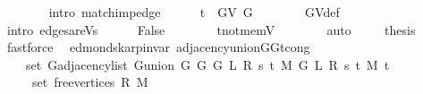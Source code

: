 \begin{isabellebody}
\ \ \ \ \ \ \isamarkupfalse%
\ {\isacharparenleft}{\kern0pt}intro\ match{\isacharunderscore}{\kern0pt}imp{\isacharunderscore}{\kern0pt}edge{\isacharparenright}{\kern0pt}\isanewline
\ \ \ \ \isamarkupfalse%
\ {\isachardoublequoteopen}t\ {\isasymin}\ G{\isachardot}{\kern0pt}V\ G{\isachardoublequoteclose}\isanewline
\ \ \ \ \ \ \isamarkupfalse%
\ G{\isachardot}{\kern0pt}V{\isacharunderscore}{\kern0pt}def\isanewline
\ \ \ \ \ \ \isamarkupfalse%
\ {\isacharparenleft}{\kern0pt}intro\ edges{\isacharunderscore}{\kern0pt}are{\isacharunderscore}{\kern0pt}Vs{\isacharparenright}{\kern0pt}\isanewline
\ \ \ \ \isamarkupfalse%
\ False\isanewline
\ \ \ \ \ \ \isamarkupfalse%
\ t{\isacharunderscore}{\kern0pt}not{\isacharunderscore}{\kern0pt}mem{\isacharunderscore}{\kern0pt}V\isanewline
\ \ \ \ \ \ \isamarkupfalse%
\ auto\ \isacommand{{\isacharbraceright}{\kern0pt}}\isamarkupfalse%
\isanewline
\ \ \isamarkupfalse%
\ {\isacharquery}{\kern0pt}thesis\isanewline
\ \ \ \ \isamarkupfalse%
\ fastforce\isanewline
{}\isamarkupfalse%
%
\endisatagproof
{\isafoldproof}%
%
\isadelimproof
\isanewline
%
\endisadelimproof
%
\isadeliminvisible
\isanewline
%
\endisadeliminvisible
%
\isataginvisible
{}\isamarkupfalse%
\ {\isacharparenleft}{\kern0pt}\ edmonds{\isacharunderscore}{\kern0pt}karp{\isacharunderscore}{\kern0pt}invar{\isacharparenright}{\kern0pt}\ adjacency{\isacharunderscore}{\kern0pt}union{\isacharunderscore}{\kern0pt}G{}{\isacharunderscore}{\kern0pt}G{}{\isacharunderscore}{\kern0pt}t{\isacharunderscore}{\kern0pt}cong{\isacharcolon}{\kern0pt}\isanewline
\ \ \isanewline
\ \ \ \ {\isachardoublequoteopen}set\ {\isacharparenleft}{\kern0pt}G{\isachardot}{\kern0pt}adjacency{\isacharunderscore}{\kern0pt}list\ {\isacharparenleft}{\kern0pt}G{\isachardot}{\kern0pt}union\ {\isacharparenleft}{\kern0pt}G{}\ G\ {\isacharparenleft}{\kern0pt}G{}\ L\ R\ s\ t\ M{\isacharparenright}{\kern0pt}{\isacharparenright}{\kern0pt}\ {\isacharparenleft}{\kern0pt}G{}\ L\ R\ s\ t\ M{\isacharparenright}{\kern0pt}{\isacharparenright}{\kern0pt}\ t{\isacharparenright}{\kern0pt}\ {\isacharequal}{\kern0pt}\isanewline
\ \ \ \ \ set\ {\isacharparenleft}{\kern0pt}free{\isacharunderscore}{\kern0pt}vertices\ R\ M{\isacharparenright}{\kern0pt}{\isachardoublequoteclose}%
\endisataginvisible
{\isafoldinvisible}%
%
\isadeliminvisible
\isanewline
%
\endisadeliminvisible

\end{isabellebody}
